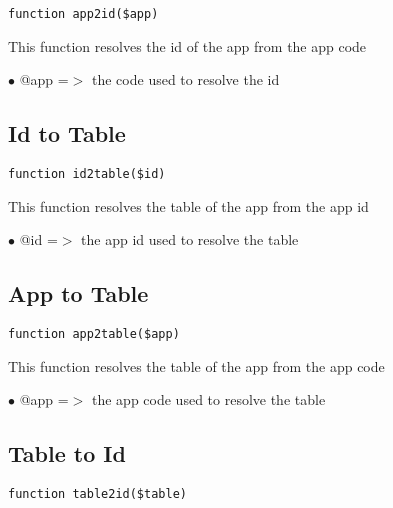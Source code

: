 \documentclass[a4paper]{book}
\begin{document}
\begin{lstlisting}
function app2id($app)
\end{lstlisting}

This function resolves the id of the app from the app code

\begin{compactitem}
\item[\color{myblue}$\bullet$] @app =$>$ the code used to resolve the id
\end{compactitem}

\hypertarget{toc25}{}
\subsection{Id to Table}

\begin{lstlisting}
function id2table($id)
\end{lstlisting}

This function resolves the table of the app from the app id

\begin{compactitem}
\item[\color{myblue}$\bullet$] @id =$>$ the app id used to resolve the table
\end{compactitem}

\hypertarget{toc26}{}
\subsection{App to Table}

\begin{lstlisting}
function app2table($app)
\end{lstlisting}

This function resolves the table of the app from the app code

\begin{compactitem}
\item[\color{myblue}$\bullet$] @app =$>$ the app code used to resolve the table
\end{compactitem}

\hypertarget{toc27}{}
\subsection{Table to Id}

\begin{lstlisting}
function table2id($table)
\end{lstlisting}
\end{document}
